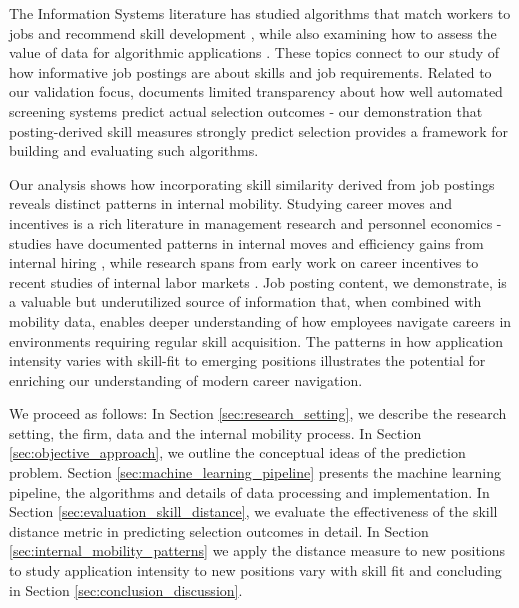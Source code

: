 The Information Systems literature has studied algorithms that match workers to jobs and recommend skill 
development \parencite{kokkodis2021demand, kokkodis2023good}, while also examining how to assess the value 
of data for algorithmic applications \parencite{lei2024value}. These topics connect to our study of how 
informative job postings are about skills and job requirements. Related to our validation focus, 
\parencite{raghavan2020mitigating} documents limited transparency about how well automated screening 
systems predict actual selection outcomes - our demonstration that posting-derived skill measures 
strongly predict selection provides a framework for building and evaluating such algorithms.

Our analysis shows how incorporating skill similarity derived from job postings reveals distinct patterns 
in internal mobility. Studying career moves and incentives is a rich literature in management research and 
personnel economics - studies have documented patterns in internal moves \parencite{bidwell2024stepping} and 
efficiency gains from internal hiring \parencite{bidwell2011paying}, while research spans from early work 
on career incentives \parencite{baker1994internal, baker1994wage} to recent studies of internal labor 
markets \parencite{tambe2020paying, huitfeldt2023internal}. Job posting content, we demonstrate, is a 
valuable but underutilized source of information that, when combined with mobility data, enables deeper 
understanding of how employees navigate careers in environments requiring regular skill acquisition. 
The patterns in how application intensity varies with skill-fit to emerging positions illustrates the 
potential for enriching our understanding of modern career navigation.


We proceed as follows: In Section \ref{sec:research_setting}, we describe the research setting, the firm, 
data and the internal mobility process. In Section \ref{sec:objective_approach}, we outline the conceptual 
ideas of the prediction problem. Section \ref{sec:machine_learning_pipeline} presents the machine learning 
pipeline, the algorithms and details of data processing and implementation. In 
Section \ref{sec:evaluation_skill_distance}, we evaluate the effectiveness of the skill distance metric 
in predicting selection outcomes in detail. In Section \ref{sec:internal_mobility_patterns} we apply the 
distance measure to new positions to study application intensity to new positions vary with skill fit 
and concluding in Section \ref{sec:conclusion_discussion}. 
